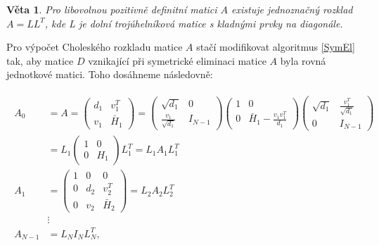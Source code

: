 \documentclass{ctuthesis}
\theoremstyle{plain}
\newtheorem{theorem}{Věta}
\theoremstyle{definition}
\begin{document}
\begin{theorem}
  Pro libovolnou pozitivně definitní matici $A$ existuje jednoznačný rozklad $A=LL^T$, kde L je dolní trojúhelníková matice s kladnými prvky na diagonále.
\end{theorem}

Pro výpočet Choleského rozkladu matice $A$ stačí modifikovat algoritmus \ref{SymEl} tak, aby matice $D$ vznikající při symetrické eliminaci matice $A$ byla rovná jednotkové matici. Toho dosáhneme následovně:

\begin{gather}
\begin{aligned}
\label{Cholesky}
A_0 & = A = \left( \begin{matrix}
               d_1 & v_1^T \\
               v_1 & \bar{H}_1
             \end{matrix} \right)
           =\left(\begin{matrix}
              \sqrt{d_1}      & 0 \\
              \frac{v_1}{\sqrt{d_1}} & I_{N-1}
            \end{matrix} \right)
            \left(\begin{matrix}
              1   & 0 \\
              0   & \bar{H}_1-\frac{v_1v_1^T}{d_1}
            \end{matrix} \right)
            \left(\begin{matrix}
              \sqrt{d_1} & \frac{v_1^T}{\sqrt{d_1}} \\
              0 & I_{N-1}
            \end{matrix} \right) \\
    &     = L_1
            \left(\begin{matrix}
              1 & 0 \\
              0 & H_1
            \end{matrix} \right)
            L_1^T
          = L_1 A_1 L_1^T \\
  A_1 & = \left( \begin{matrix}
               1   &  0   & 0 \\
               0   &  d_2 & v_2^T \\
               0   &  v_2 & \bar{H}_2
             \end{matrix} \right)
        =  L_2 A_2 L_2^T \\
    & \vdots \\
  A_{N-1} & = L_N I_N L_N^T,
\end{aligned}
\end{gather}
\end{document}
